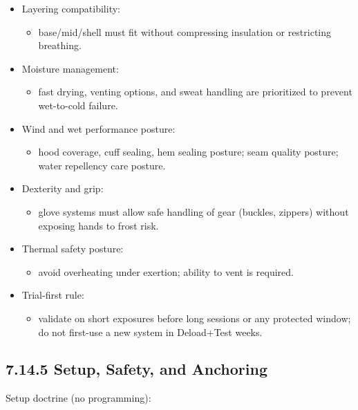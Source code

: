 \documentclass[10pt]{article}
\begin{document}
\begin{itemize}
\item Layering compatibility:
  \begin{itemize}
  \item base/mid/shell must fit without compressing insulation or restricting breathing.
  \end{itemize}
\item Moisture management:
  \begin{itemize}
  \item fast drying, venting options, and sweat handling are prioritized to prevent wet-to-cold failure.
  \end{itemize}
\item Wind and wet performance posture:
  \begin{itemize}
  \item hood coverage, cuff sealing, hem sealing posture; seam quality posture; water repellency care posture.
  \end{itemize}
\item Dexterity and grip:
  \begin{itemize}
  \item glove systems must allow safe handling of gear (buckles, zippers) without exposing hands to frost risk.
  \end{itemize}
\item Thermal safety posture:
  \begin{itemize}
  \item avoid overheating under exertion; ability to vent is required.
  \end{itemize}
\item Trial-first rule:
  \begin{itemize}
  \item validate on short exposures before long sessions or any protected window; do not first-use a new system in Deload+Test weeks.
  \end{itemize}
\end{itemize}

\subsection*{7.14.5 Setup, Safety, and Anchoring}
{}

Setup doctrine (no programming):
\end{document}
